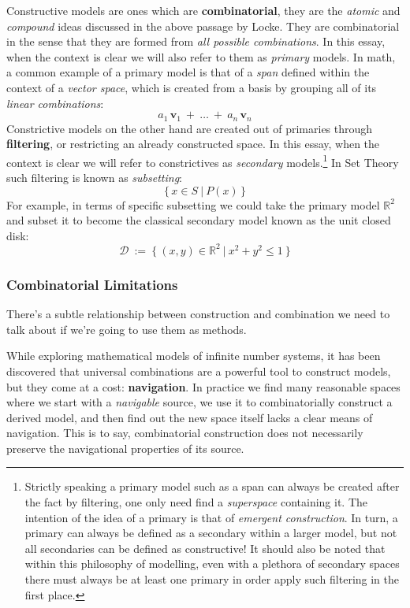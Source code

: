 \documentclass[twoside]{article}
\newcommand{\strong}[1]{{\bfseries #1}}
\newcommand{\bv}[1][v]{\mathbf{#1}}
\begin{document}
Constructive models are ones which are \strong{combinatorial}, they are the \emph{atomic} and \emph{compound}
ideas discussed in the above passage by Locke. They are combinatorial in the sense that they are formed from
\emph{all possible combinations}. In this essay, when the context is clear we will also refer to them as \emph{primary}
models. In math, a common example of a primary model is that of a \emph{span} defined within the context of
a \emph{vector space}, which is created from a basis by grouping all of its \emph{linear combinations}:
$$ a_1\,\bv_1\ +\ \ldots\ +\ a_n\,\bv_n $$
Constrictive models on the other hand are created out of primaries through \strong{filtering}, or restricting an
already constructed space. In this essay, when the context is clear we will refer to constrictives as \emph{secondary}
models.\footnote{Strictly speaking a primary model such as a span can always be created after the fact by filtering,
one only need find a \emph{superspace} containing it. The intention of the idea of a primary is that of
\emph{emergent construction}. In turn, a primary can always be defined as a secondary within a larger model,
but not all secondaries can be defined as constructive! It should also be noted that within this philosophy
of modelling, even with a plethora of secondary spaces there must always be at least one primary in order
apply such filtering in the first place.} In Set Theory such filtering is known as \emph{subsetting}:
$$ \{\,x\in S\ |\ P(x)\,\} $$
For example, in terms of specific subsetting we could take the primary model $ \mathbb{R}^2 $ and subset it to become
the classical secondary model known as the unit closed disk:
$$ \mathcal{D}\ :=\ \{\ (x,y)\in\mathbb{R}^2\ |\ x^2+y^2 \le 1\ \} $$

\subsubsection*{Combinatorial Limitations}

There's a subtle relationship between construction and combination we need to talk about if we're going to use them as methods.

While exploring mathematical models of infinite number systems, it has been discovered that universal combinations are
a powerful tool to construct models, but they come at a cost: \strong{navigation}. In practice we find many reasonable
spaces where we start with a \emph{navigable} source, we use it to combinatorially construct a derived model, and then
find out the new space itself lacks a clear means of navigation. This is to say, combinatorial construction does not
necessarily preserve the navigational properties of its source.
\end{document}
